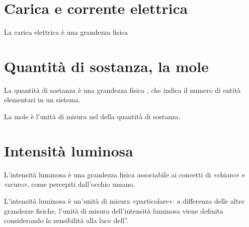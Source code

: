 \documentclass[letterpaper,10pt,italian]{jupyterBook}
\begin{document}
\sphinxAtStartPar
{}

\sphinxstepscope


\section{Carica e corrente elettrica}
\label{\detokenize{ch/intro/physical_quantities-charge:carica-e-corrente-elettrica}}\label{\detokenize{ch/intro/physical_quantities-charge:physics-hs-intro-physical-quantities-charge}}\label{\detokenize{ch/intro/physical_quantities-charge::doc}}
\sphinxAtStartPar
La carica elettrica è una grandezza fisica

\sphinxAtStartPar
{}

\sphinxstepscope


\section{Quantità di sostanza, la mole}
\label{\detokenize{ch/intro/physical_quantities-mole:quantita-di-sostanza-la-mole}}\label{\detokenize{ch/intro/physical_quantities-mole:physics-hs-intro-physical-quantities-mole}}\label{\detokenize{ch/intro/physical_quantities-mole::doc}}
\sphinxAtStartPar
La quantità di sostanza è una grandezza fisica , che indica il numero di entità elementari in un sistema.

\sphinxAtStartPar
{} La mole è l’unità di misura nel {\hyperref[\detokenize{ch/intro::doc}]{}} della quantità di sostanza.

\sphinxstepscope


\section{Intensità luminosa}
\label{\detokenize{ch/intro/physical_quantities-luminosity:intensita-luminosa}}\label{\detokenize{ch/intro/physical_quantities-luminosity:physics-hs-intro-physical-quantities-luminosity}}\label{\detokenize{ch/intro/physical_quantities-luminosity::doc}}
\sphinxAtStartPar
L’intensità luminosa è una grandezza fisica associabile ai concetti di «chiaro» e «scuro», come percepiti dall’occhio umano.

\sphinxAtStartPar
{} L’intensità luminosa è un’unità di misura «particolare»: a differenza delle altre grandezze fisiche, l’unità di misura dell’intensità luminosa viene definita considerando la sensibilità alla luce dell”{\hyperref[\detokenize{ch/intro/sensing-sight:physics-hs-intro-sensing-sight}]{}}.
\end{document}
